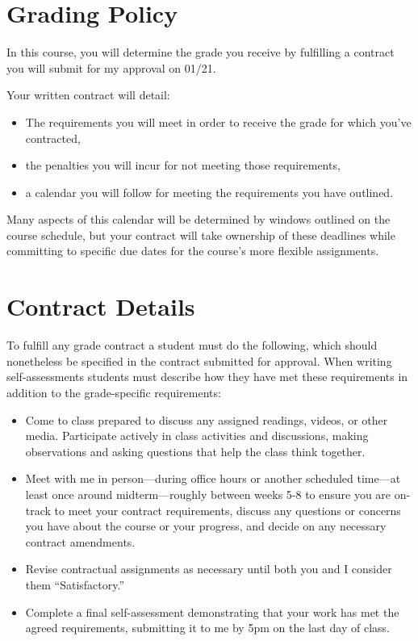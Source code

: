 \hypertarget{grading-policy-2}{%
\section*{Grading Policy}\label{grading-policy-2}}


In this course, you will determine the grade you receive by fulfilling a contract you will submit for my approval on 01/21.

Your written contract will detail:

\begin{itemize}
\item
  The requirements you will meet in order to receive the grade for which you've contracted,
\item
  the penalties you will incur for not meeting those requirements,
\item
  a calendar you will follow for meeting the requirements you have outlined.
\end{itemize}

Many aspects of this calendar will be determined by windows outlined on the course schedule, but your contract will take ownership of these deadlines while committing to specific due dates for the course's more flexible assignments.

\hypertarget{contract-details}{%
\section{Contract Details}\label{contract-details}}

To fulfill any grade contract a student must do the following, which should nonetheless be specified in the contract submitted for approval. When writing self-assessments students must describe how they have met these requirements in addition to the grade-specific requirements:

\begin{itemize}
\item
  Come to class prepared to discuss any assigned readings, videos, or other media. Participate actively in class activities and discussions, making observations and asking questions that help the class think together.
\item
  Meet with me in person---during office hours or another scheduled time---at least once around midterm---roughly between weeks 5-8 to ensure you are on-track to meet your contract requirements, discuss any questions or concerns you have about the course or your progress, and decide on any necessary contract amendments.
\item
  Revise contractual assignments as necessary until both you and I consider them ``Satisfactory.''
\item
  Complete a final self-assessment demonstrating that your work has met the agreed requirements, submitting it to me by 5pm on the last day of class.
\end{itemize}

